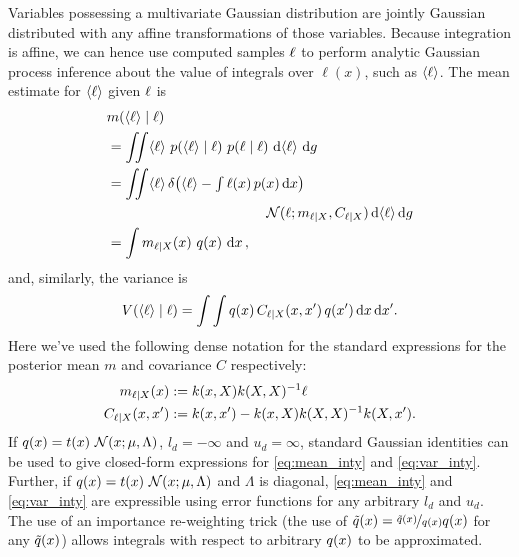 \documentclass[twoside]{article}
\begin{document}
Variables possessing a multivariate Gaussian distribution are jointly Gaussian distributed with any affine transformations of those variables. Because integration is affine, we can hence use computed samples $\ell$ to perform analytic Gaussian process inference about the value of integrals over $\ell(x)$, such as $\langle \ell \rangle$. The mean estimate for $\langle \ell \rangle$ given $\ell$ is
%
\begin{align} 
&
\mean{\inty{\ell}}{\v{\ell}} 
\nonumber\\
& =\iint \inty{\ell}~\p{\inty{\ell}}{\ell}~\p{\ell}{\v{\ell}}~\ud \inty{\ell}~\ud g                                                                                                                                                               \nonumber\\
&
 =\iint \inty{\ell}\,\delta\bigl(\inty{\ell}- {\textstyle\int \ell(\vx)\,p(\vx)\,\ud \vx}\bigr)
\nonumber\\
& \hspace{4cm}
\N{\ell}{m_{\ell|X}}{C_{\ell|X}}\,\ud \inty{\ell}\,\ud g 
\nonumber\\
&
 = \int m_{\ell|X}(\vx)~q(\vx)~\ud \vx
\,, \label{eq:mean_inty}
\end{align}
and, similarly, the variance is
\begin{align} 
V(\langle \ell \rangle\mid\ell)
=\int \int q(x)\,C_{\ell|X}(x, x')\,q(x')\,\mathrm{d} x\,\mathrm{d} x'
. \label{eq:var_inty}
\end{align}
Here we've used the following dense notation for the standard \gp expressions for the posterior mean $m$ and covariance $C$ respectively:
\begin{align}
m_{\ell|X}(x)& := k(x, X) k(X, X)^{-1} \ell\\
C_{\ell|X}(x, x')& := k(x, x') - k(x, X) k(X, X)^{-1} k(X, x').
\end{align}
If $q(x)= t(x)~\mathcal{N}(x;\mu,\Lambda)$, $l_d=-\infty$ and $u_d=\infty$,  standard Gaussian identities \citep{BZMonteCarlo} can be used to give closed-form expressions for \eqref{eq:mean_inty} and \eqref{eq:var_inty}. Further, if $q(x)= t(x)~\mathcal{N}(x;\mu,\Lambda)$ and $\Lambda$ is diagonal, \eqref{eq:mean_inty} and \eqref{eq:var_inty} are expressible using error functions for any arbitrary $l_d$ and $u_d$.
The use of an importance re-weighting trick (the use of $\tilde{q}(x) = \nicefrac{\tilde{q}(x)}{q(x)} q(x)$ for any $\tilde{q}(x)$) allows integrals with respect to arbitrary $q(x)$ to be approximated. 
\end{document}
